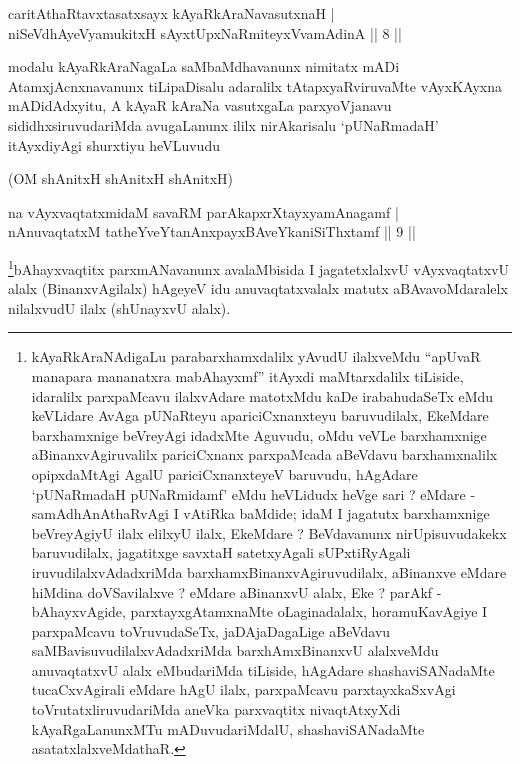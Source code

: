 \begin{shl}
caritAthaRtavxtasatxsayx kAyaRkAraNavasutxnaH  | \\
niSeVdhAyeVyamukitxH sAyxtUpxNaRmiteyxVvamAdinA \hfill||  8 ||  
\end{shl}

\begin{artha}
modalu kAyaRkAraNagaLa saMbaMdhavanunx nimitatx mADi AtamxjAcnxnavanunx tiLipaDisalu adaralilx tAtapxyaRviruvaMte vAyxKAyxna mADidAdxyitu, A kAyaR kAraNa vasutxgaLa parxyoVjanavu sididhxsiruvudariMda avugaLanunx ililx nirAkarisalu `pUNaRmadaH' itAyxdiyAgi shurxtiyu heVLuvudu \mdash 
\end{artha}

\begin{center}
(OM shAnitxH shAnitxH shAnitxH)
\end{center}


\begin{shl}
na vAyxvaqtatxmidaM savaRM parAkapxrXtayxyamAnagamf  | \\
nAnuvaqtatxM tatheYveYtanAnxpayxBAveYkaniSiThxtamf \hfill||  9 ||  
\end{shl}

\begin{artha}
\footnote{kAyaRkAraNAdigaLu parabarxhamxdalilx yAvudU ilalxveMdu ``apUvaR manapara mananatxra mabAhayxmf'' itAyxdi maMtarxdalilx tiLiside, idaralilx parxpaMcavu ilalxvAdare matotxMdu kaDe irabahudaSeTx eMdu keVLidare AvAga pUNaRteyu apariciCxnanxteyu baruvudilalx, EkeMdare barxhamxnige beVreyAgi idadxMte Aguvudu, oMdu veVLe barxhamxnige aBinanxvAgiruvalilx pariciCxnanx parxpaMcada aBeVdavu barxhamxnalilx opipxdaMtAgi AgalU pariciCxnanxteyeV baruvudu, hAgAdare `pUNaRmadaH pUNaRmidamf' eMdu heVLidudx heVge sari ? eMdare - samAdhAnAthaRvAgi I vAtiRka baMdide; idaM I jagatutx barxhamxnige beVreyAgiyU ilalx elilxyU ilalx, EkeMdare ? BeVdavanunx nirUpisuvudakekx baruvudilalx, jagatitxge savxtaH satetxyAgali sUPxtiRyAgali iruvudilalxvAdadxriMda barxhamxBinanxvAgiruvudilalx, aBinanxve eMdare hiMdina doVSavilalxve ? eMdare aBinanxvU alalx, Eke ? parAkf - bAhayxvAgide, parxtayxgAtamxnaMte oLaginadalalx, horamuKavAgiye I parxpaMcavu toVruvudaSeTx, jaDAjaDagaLige aBeVdavu saMBavisuvudilalxvAdadxriMda barxhAmxBinanxvU alalxveMdu anuvaqtatxvU alalx eMbudariMda tiLiside, hAgAdare shashaviSANadaMte tucaCxvAgirali eMdare hAgU ilalx, parxpaMcavu parxtayxkaSxvAgi toVrutatxliruvudariMda aneVka parxvaqtitx nivaqtAtxyXdi kAyaRgaLanunxMTu mADuvudariMdalU, shashaviSANadaMte asatatxlalxveMdathaR.}bAhayxvaqtitx parxmANavanunx avalaMbisida I jagatetxlalxvU vAyxvaqtatxvU alalx (BinanxvAgilalx) hAgeyeV idu anuvaqtatxvalalx matutx aBAvavoMdaralelx nilalxvudU ilalx (shUnayxvU alalx).
\end{artha}

